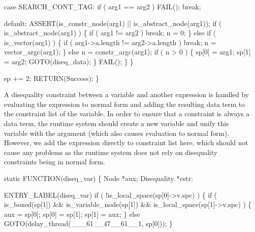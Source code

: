             case SEARCH_CONT_TAG:
                if ( arg1 == arg2 )
                    FAIL();
                break;

            default:
                ASSERT(is_constr_node(arg1) || is_abstract_node(arg1));
                if ( is_abstract_node(arg1) )
                \{
                    if ( arg1 != arg2 )
                        break;
                    n = 0;
                \}
                else if ( is_vector(arg1) )
                \{
                    if ( arg1->a.length != arg2->a.length )
                        break;
                    n = vector_argc(arg1);
                \}
                else
                    n = constr_argc(arg1);
                if ( n > 0 )
                \{
                    sp[0] = arg1;
                    sp[1] = arg2;
                    GOTO(diseq_data);
                \}
                FAIL();
        \}
    \}

    sp += 2;
    RETURN(Success);
\}

\nwendcode{}\nwdocspar
A disequality constraint between a variable and another expression is
handled by evaluating the expression to normal form and adding the
resulting data term to the constraint list of the variable. In
order to ensure that a constraint is always a data term, the runtime
system should create a new variable and unify this variable with the
argument (which also causes evaluation to normal form). However, we
add the expression directly to constraint list here, which should not
cause any problems as the runtime system does not rely on disequality
constraints being in normal form.


\nwenddocs{}\plusendmoddef\nwstartdeflinemarkup{}\nwenddeflinemarkup
static
FUNCTION(diseq_var)
\{
    Node        *aux;
    Disequality *cstr;

 ENTRY_LABEL(diseq_var)
    if ( !is_local_space(sp[0]->v.spc) )
    \{
        if ( is_boxed(sp[1]) && is_variable_node(sp[1])
             && is_local_space(sp[1]->v.spc) )
        \{
            aux   = sp[0];
            sp[0] = sp[1];
            sp[1] = aux;
        \}
        else
            GOTO(delay_thread(___61__47__61__1, sp[0]));
    \}

